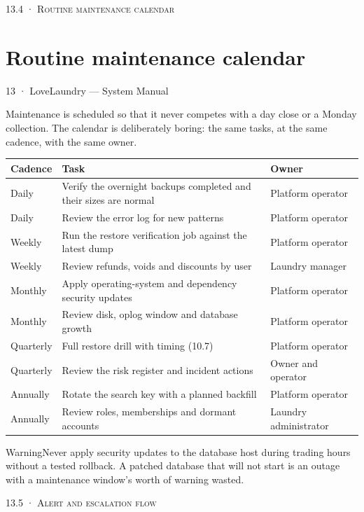 \documentclass[11pt,a4paper,oneside]{book}
\begin{document}
\textsc{\small\color{crimson}13.4 · Routine maintenance calendar}\par\medskip
\section*{Routine maintenance calendar}
13 · LoveLaundry — System Manual

Maintenance is scheduled so that it never competes with a day close or a Monday collection. The calendar is deliberately boring: the same tasks, at the same cadence, with the same owner.

\begin{center}\small
\begin{tabularx}{\linewidth}{|X|X|X|}
\hline
\rowcolor{lightgrey}
\textbf{Cadence} & \textbf{Task} & \textbf{Owner} \\ \hline
Daily & Verify the overnight backups completed and their sizes are normal & Platform operator \\ \hline
Daily & Review the error log for new patterns & Platform operator \\ \hline
Weekly & Run the restore verification job against the latest dump & Platform operator \\ \hline
Weekly & Review refunds, voids and discounts by user & Laundry manager \\ \hline
Monthly & Apply operating-system and dependency security updates & Platform operator \\ \hline
Monthly & Review disk, oplog window and database growth & Platform operator \\ \hline
Quarterly & Full restore drill with timing (10.7) & Platform operator \\ \hline
Quarterly & Review the risk register and incident actions & Owner and operator \\ \hline
Annually & Rotate the search key with a planned backfill & Platform operator \\ \hline
Annually & Review roles, memberships and dormant accounts & Laundry administrator \\ \hline
\end{tabularx}
\end{center}
\begin{notebox}WarningNever apply security updates to the database host during trading hours without a tested rollback. A patched database that will not start is an outage with a maintenance window's worth of warning wasted.\end{notebox}
\textsc{\small\color{crimson}13.5 · Alert and escalation flow}\par\medskip
\end{document}
